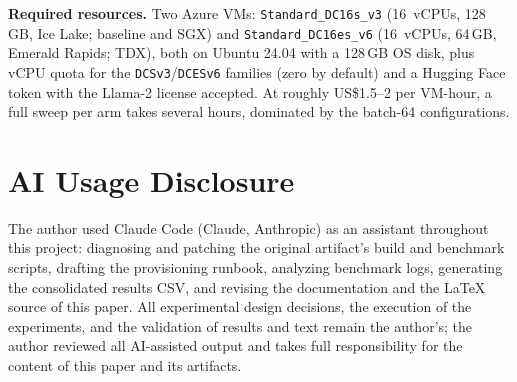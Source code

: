 \documentclass[sigconf]{acmart}
\begin{document}
\textbf{Required resources.} Two Azure VMs: \texttt{Standard\_DC16s\_v3}
(16~vCPUs, 128\,GB, Ice Lake; baseline and SGX) and \texttt{Standard\_DC16es\_v6}
(16~vCPUs, 64\,GB, Emerald Rapids; TDX), both on Ubuntu 24.04 with a 128\,GB OS
disk, plus vCPU quota for the \texttt{DCSv3}/\texttt{DCESv6} families (zero by
default) and a Hugging Face token with the Llama-2 license accepted. At roughly
US\$1.5--2 per VM-hour, a full sweep per arm takes several hours, dominated by the
batch-64 configurations.

\section*{AI Usage Disclosure}

The author used Claude Code (Claude, Anthropic) as an assistant throughout this
project: diagnosing and patching the original artifact's build and benchmark
scripts, drafting the provisioning runbook, analyzing benchmark logs, generating
the consolidated results CSV, and revising the documentation and the \LaTeX{}
source of this paper. All experimental design decisions, the execution of the
experiments, and the validation of results and text remain the author's; the
author reviewed all AI-assisted output and takes full responsibility for the
content of this paper and its artifacts.



\end{document}
